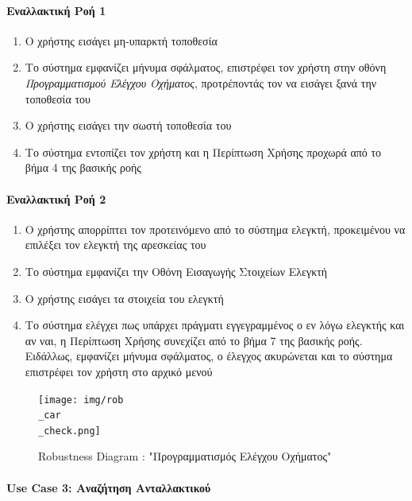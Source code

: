 \documentclass{../ol-softwaremanual}
\begin{document}
	
	
	\paragraph{Εναλλακτική Ροή 1}
	
	\begin{enumerate}
		\item Ο χρήστης εισάγει μη-υπαρκτή τοποθεσία
		\item Το σύστημα εμφανίζει μήνυμα σφάλματος, επιστρέφει τον χρήστη στην οθόνη \textit{Προγραμματισμού Ελέγχου Οχήματος}, προτρέποντάς τον να εισάγει ξανά την τοποθεσία του
		\item Ο χρήστης εισάγει την σωστή τοποθεσία του
		\item Το σύστημα εντοπίζει τον χρήστη και η Περίπτωση Χρήσης προχωρά από το βήμα 4 της βασικής ροής
	\end{enumerate}
	
	\paragraph{Εναλλακτική Ροή 2}
	
	\begin{enumerate}
		\item Ο χρήστης απορρίπτει τον προτεινόμενο από το σύστημα ελεγκτή, προκειμένου να επιλέξει τον ελεγκτή της αρεσκείας του
		\item Το σύστημα εμφανίζει την Οθόνη Εισαγωγής Στοιχείων Ελεγκτή
		\item Ο χρήστης εισάγει τα στοιχεία του ελεγκτή
		\item Το σύστημα ελέγχει πως υπάρχει πράγματι εγγεγραμμένος ο εν λόγω ελεγκτής και αν ναι, η Περίπτωση Χρήσης συνεχίζει από το βήμα 7 της βασικής ροής. Ειδάλλως, εμφανίζει μήνυμα σφάλματος, ο έλεγχος ακυρώνεται και το σύστημα επιστρέφει τον χρήστη στο αρχικό μενού
	\end{enumerate}	
	
	
	\begin{figure}[htbp!]
		\texttt{[image: img/rob\\\_car\\\_check.png]}
		\caption{\en Robustness Diagram : "\gr Προγραμματισμός Ελέγχου Οχήματος\en"\gr}
	\end{figure}
	
	
	\newpage
	\centering
	
	\paragraph{\en Use Case 3: \gr Αναζήτηση Ανταλλακτικού}	
	
\end{document}
